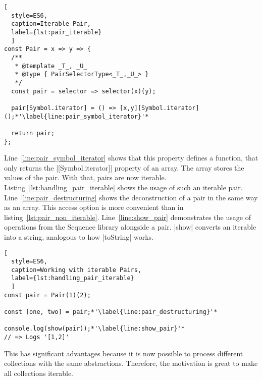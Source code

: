 \begin{lstlisting}[
  style=ES6, 
  caption=Iterable Pair,
  label={lst:pair_iterable}
  ]
const Pair = x => y => {
  /**
   * @template _T_, _U_
   * @type { PairSelectorType<_T_,_U_> }
   */
  const pair = selector => selector(x)(y);

  pair[Symbol.iterator] = () => [x,y][Symbol.iterator]();*'\label{line:pair_symbol_iterator}'*

  return pair;
};
\end{lstlisting}

Line~\ref{line:pair_symbol_iterator} shows that 
this property defines a function, that only returns the |[Symbol.iterator]|
property of an array. The array stores the values of the pair. With that, pairs
are now iterable. Listing~\ref{lst:handling_pair_iterable} shows the usage of
such an iterable pair. Line~\ref{line:pair_destructuring} shows the
deconstruction of a pair in the same way as an array. This access option is
more convenient than in listing~\ref{lst:pair_non_iterable}.
Line~\ref{line:show_pair} demonstrates the usage of operations from the Sequence
library alongside a pair. |show| converts an iterable into a string, analogous
to how |toString| works.

\begin{lstlisting}[
  style=ES6, 
  caption=Working with iterable Pairs,
  label={lst:handling_pair_iterable}
  ]
const pair = Pair(1)(2);

const [one, two] = pair;*'\label{line:pair_destructuring}'*

console.log(show(pair));*'\label{line:show_pair}'*
// => Logs '[1,2]'
\end{lstlisting}

This has significant advantages because it is now possible to process different 
collections with the same abstractions. Therefore, the motivation is great to 
make all collections iterable.

